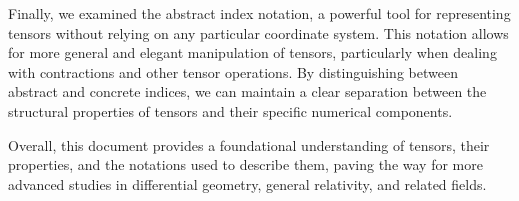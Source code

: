 \documentclass{article}
\begin{document}
Finally, we examined the abstract index notation, a powerful tool for representing tensors without relying on any particular coordinate system. This notation allows for more general and elegant manipulation of tensors, particularly when dealing with contractions and other tensor operations. By distinguishing between abstract and concrete indices, we can maintain a clear separation between the structural properties of tensors and their specific numerical components.

Overall, this document provides a foundational understanding of tensors, their properties, and the notations used to describe them, paving the way for more advanced studies in differential geometry, general relativity, and related fields.
\end{document}
